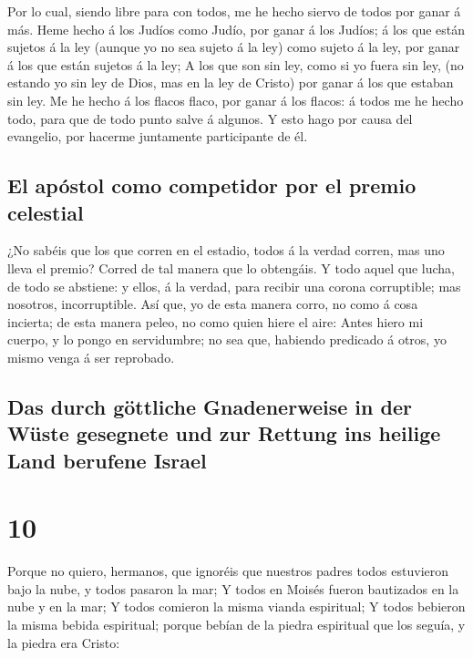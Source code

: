  Por lo cual, siendo libre para con todos, me he hecho
siervo de todos por ganar á más.  Heme hecho á los Judíos
como Judío, por ganar á los Judíos; á los que están sujetos á la ley
(aunque yo no sea sujeto á la ley) como sujeto á la ley, por ganar á los
que están sujetos á la ley;  A los que son sin ley, como si
yo fuera sin ley, (no estando yo sin ley de Dios, mas en la ley de
Cristo) por ganar á los que estaban sin ley.  Me he hecho á
los flacos flaco, por ganar á los flacos: á todos me he hecho todo, para
que de todo punto salve á algunos.  Y esto hago por causa
del evangelio, por hacerme juntamente participante de él.

\hypertarget{el-apuxf3stol-como-competidor-por-el-premio-celestial}{%
\subsection{El apóstol como competidor por el premio
celestial}\label{el-apuxf3stol-como-competidor-por-el-premio-celestial}}

 ¿No sabéis que los que corren en el estadio, todos á la
verdad corren, mas uno lleva el premio? Corred de tal manera que lo
obtengáis.  Y todo aquel que lucha, de todo se abstiene: y
ellos, á la verdad, para recibir una corona corruptible; mas nosotros,
incorruptible.  Así que, yo de esta manera corro, no como á
cosa incierta; de esta manera peleo, no como quien hiere el aire:
 Antes hiero mi cuerpo, y lo pongo en servidumbre; no sea
que, habiendo predicado á otros, yo mismo venga á ser reprobado.

\hypertarget{das-durch-guxf6ttliche-gnadenerweise-in-der-wuxfcste-gesegnete-und-zur-rettung-ins-heilige-land-berufene-israel}{%
\subsection{Das durch göttliche Gnadenerweise in der Wüste gesegnete und
zur Rettung ins heilige Land berufene
Israel}\label{das-durch-guxf6ttliche-gnadenerweise-in-der-wuxfcste-gesegnete-und-zur-rettung-ins-heilige-land-berufene-israel}}

\hypertarget{section-9}{%
\section{10}\label{section-9}}

 Porque no quiero, hermanos, que ignoréis que nuestros
padres todos estuvieron bajo la nube, y todos pasaron la mar;
 Y todos en Moisés fueron bautizados en la nube y en la mar;
 Y todos comieron la misma vianda espiritual;  Y
todos bebieron la misma bebida espiritual; porque bebían de la piedra
espiritual que los seguía, y la piedra era Cristo:

